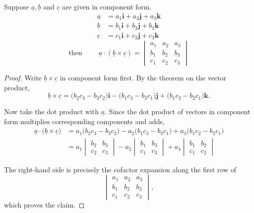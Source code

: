 \documentclass[11pt,a4paper]{article}
\theoremstyle{definition}
\begin{document}
Suppose $\underline{a}, \underline{b}$ and $\underline{c}$ are given in component form.
\begin{align*}
\underline{a} & = a_1\textbf{i} + a_2\textbf{j} + a_3\textbf{k}\\
\underline{b} & = b_1\textbf{i} + b_2\textbf{j} + b_3\textbf{k}\\
\underline{c} & = c_1\textbf{i} + c_2\textbf{j} + c_3\textbf{k}
\end{align*}
$$\text{then}\hspace{1cm}\underline{a}\cdot (\underline{b} \times \underline{c}) = \begin{vmatrix}
a_1 & a_2 & a_3\\
b_1 & b_2 & b_3\\
c_1 & c_2 & c_3
\end{vmatrix}$$

\begin{proof}
Write $\underline{b}\times\underline{c}$ in component form first. By the theorem
on the vector product,
$$\underline{b}\times\underline{c}
= \big(b_2c_3 - b_3c_2\big)\textbf{i}
- \big(b_1c_3 - b_3c_1\big)\textbf{j}
+ \big(b_1c_2 - b_2c_1\big)\textbf{k}.$$

Now take the dot product with $\underline{a}$. Since the dot product of vectors
in component form multiplies corresponding components and adds,
\begin{align*}
\underline{a}\cdot\big(\underline{b}\times\underline{c}\big)
&= a_1\big(b_2c_3 - b_3c_2\big)
 - a_2\big(b_1c_3 - b_3c_1\big)
 + a_3\big(b_1c_2 - b_2c_1\big)\\
&= a_1\begin{vmatrix} b_2 & b_3\\ c_2 & c_3\end{vmatrix}
 - a_2\begin{vmatrix} b_1 & b_3\\ c_1 & c_3\end{vmatrix}
 + a_3\begin{vmatrix} b_1 & b_2\\ c_1 & c_2\end{vmatrix}
\end{align*}

The right-hand side is precisely the cofactor expansion along the first row of
$$\begin{vmatrix}
a_1 & a_2 & a_3\\
b_1 & b_2 & b_3\\
c_1 & c_2 & c_3
\end{vmatrix},$$
which proves the claim.
\end{proof}
\end{document}
